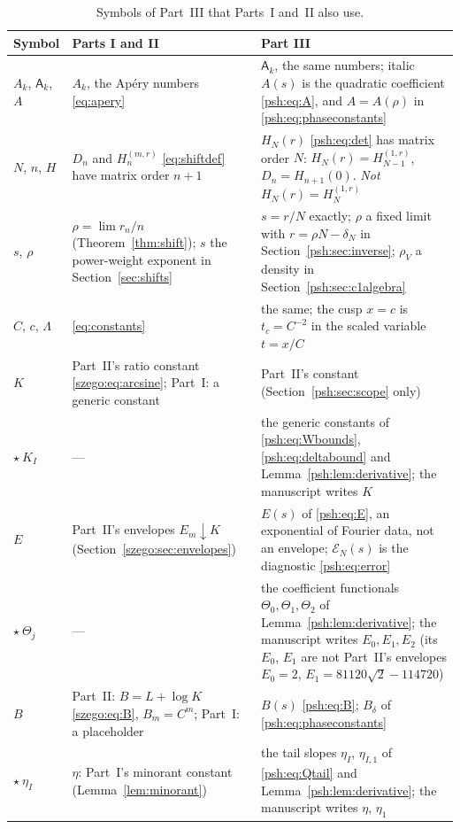 \documentclass[11pt,a4paper]{article}
\numberwithin{equation}{section}
\theoremstyle{remark}\newtheorem{remark}[theorem]{Remark}
\newcommand{\A}{\mathsf A}
\begin{document}
\begin{table}[p]
\centering\small
\caption{Symbols of Part~III that Parts~I and~II also use.}\label{psh:tab:notation}
\begin{tabular}{>{\raggedright\arraybackslash}p{}>{\raggedright\arraybackslash}p{}>{\raggedright\arraybackslash}p{}}
\toprule
Symbol & Parts I and II & Part III\\
\midrule
$A_k$, $\A_k$, $A$ & $A_k$, the Ap\'ery numbers \eqref{eq:apery} & $\A_k$, the same numbers; italic $A(s)$ is the quadratic coefficient \eqref{psh:eq:A}, and $A=A(\rho)$ in \eqref{psh:eq:phaseconstants}\\[2pt]
$N$, $n$, $H$ & $D_n$ and $H^{(m,r)}_n$ \eqref{eq:shiftdef} have matrix order $n+1$ & $H_N(r)$ \eqref{psh:eq:det} has matrix order $N$: $H_N(r)=H^{(1,r)}_{N-1}$, $D_n=H_{n+1}(0)$. \emph{Not} $H_N(r)=H^{(1,r)}_N$\\[2pt]
$s$, $\rho$ & $\rho=\lim r_n/n$ (Theorem~\ref{thm:shift}); $s$ the power-weight exponent in Section~\ref{sec:shifts} & $s=r/N$ exactly; $\rho$ a fixed limit with $r=\rho N-\delta_N$ in Section~\ref{psh:sec:inverse}; $\rho_V$ a density in Section~\ref{psh:sec:c1algebra}\\[2pt]
$C$, $c$, $\Lambda$ & \eqref{eq:constants} & the same; the cusp $x=c$ is $t_c=C^{-2}$ in the scaled variable $t=x/C$\\[2pt]
$K$ & Part~II's ratio constant \eqref{szego:eq:arcsine}; Part~I: a generic constant & Part~II's constant (Section~\ref{psh:sec:scope} only)\\
$\star\ K_I$ & --- & the generic constants of \eqref{psh:eq:Wbounds}, \eqref{psh:eq:deltabound} and Lemma~\ref{psh:lem:derivative}; the manuscript writes $K$\\[2pt]
$E$ & Part~II's envelopes $E_m\downarrow K$ (Section~\ref{szego:sec:envelopes}) & $E(s)$ of \eqref{psh:eq:E}, an exponential of Fourier data, not an envelope; $\mathcal E_N(s)$ is the diagnostic \eqref{psh:eq:error}\\
$\star\ \Theta_j$ & --- & the coefficient functionals $\Theta_0,\Theta_1,\Theta_2$ of Lemma~\ref{psh:lem:derivative}; the manuscript writes $E_0,E_1,E_2$ (its $E_0$, $E_1$ are not Part~II's envelopes $E_0=2$, $E_1=81120\sqrt2-114720$)\\[2pt]
$B$ & Part~II: $B=L+\log K$ \eqref{szego:eq:B}, $B_m=C^m$; Part~I: a placeholder & $B(s)$ \eqref{psh:eq:B}; $B_\delta$ of \eqref{psh:eq:phaseconstants}\\[2pt]
$\star\ \eta_I$ & $\eta$: Part~I's minorant constant (Lemma~\ref{lem:minorant}) & the tail slopes $\eta_I$, $\eta_{I,1}$ of \eqref{psh:eq:Qtail} and Lemma~\ref{psh:lem:derivative}; the manuscript writes $\eta$, $\eta_1$\\[2pt]

\end{tabular}
\end{table}
\end{document}
